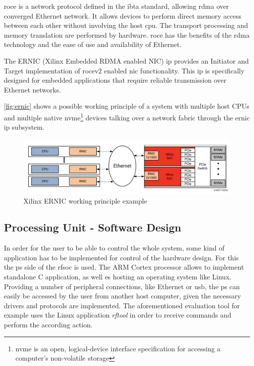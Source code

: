 \Gls{roce} is a network protocol defined in the \gls{ibta} standard, allowing \gls{rdma} over converged Ethernet network. 
It allows devices to perform direct memory access between each other without involving the host \gls{cpu}. 
The transport processing and memory translation are performed by hardware. 
\Gls{roce} has the benefits of the \gls{rdma} technology and the ease of use and availability of Ethernet.

The ERNIC (Xilinx Embedded RDMA enabled NIC) \gls{ip} provides an Initiator and Target  implementation of \gls{rocev2} enabled \gls{nic} functionality. This \gls{ip} is specifically designed for embedded applications that require reliable transmission over Ethernet networks.

\autoref{fig:ernic} shows a possible working principle of a system with multiple host CPUs and multiple native \gls{nvme}\footnote{ \gls{nvme} is an open, logical-device interface specification for accessing a computer's non-volatile storage} devices talking over a network fabric through the \gls{ernic} \gls{ip}
subsystem. \cite{ernic}

\begin{figure}[H]
	\centering
	\includegraphics[width = \textwidth]{chap/05-readout/img/ernic}
	\caption{Xilinx ERNIC working principle example \cite{ernic}}
	\label{fig:ernic}
\end{figure}

\subsection{Processing Unit - Software Design}
In order for the user to be able to control the whole system, some kind of application has to be implemented for control of the hardware design.
For this the \gls{ps} side of the \gls{rfsoc} is used. 
The ARM Cortex processor allows to implement standalone C application, as well es hosting an operating system like Linux. 
Providing a number of peripheral connections, like Ethernet or \gls{usb}, the \gls{ps} can easily be accessed by the user from another host computer, given the necessary drivers and protocols are implemented. 
The aforementioned evaluation tool for example uses the Linux application \textit{rftool} in order to receive commands and perform the according action.

